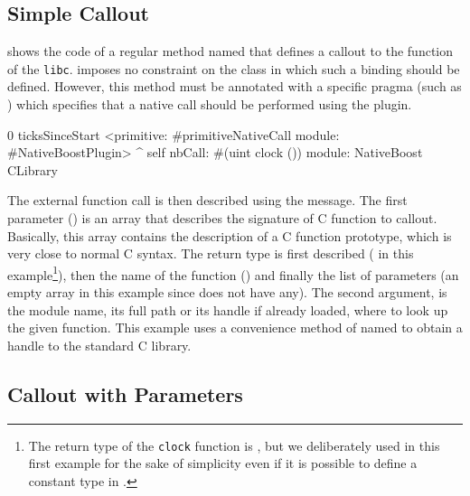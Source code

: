 \subsection{Simple Callout}

 shows the code of a regular \ST method named  that defines a callout to the  function of the \texttt{libc}.
\NB imposes no constraint on the class in which such a binding should be defined.
However, this method must be annotated with a specific pragma (such as ) which specifies that a native call should be performed using the \NB plugin.

\begin{stcode}[
	label={lst:clock},
	caption={\NBFFI example of callout declaration to the \ttt{clock} function of the \texttt{libc}}]{0}
ticksSinceStart
	<primitive: #primitiveNativeCall
	 module: #NativeBoostPlugin>
	^ self
		nbCall: #(uint clock ())
		module: NativeBoost CLibrary
\end{stcode}

The external function call is then described using the  message.
The first parameter () is an array that describes the signature of C function to callout.
Basically, this array contains the description of a C function prototype, which is very close to normal C syntax.
The return type is first described ( in this example\footnote{The return type of the \texttt{clock} function is , but we deliberately used  in this first example for the sake of simplicity even if it is possible to define a constant type in \NB.}), then the name of the function () and finally the list of parameters (an empty array in this example since  does not have any).
The second argument,  is the module name, its full path or its handle if already loaded, where to look up the given function.
This example uses a convenience method of \NB named  to obtain a handle to the standard C library.

\subsection{Callout with Parameters}

